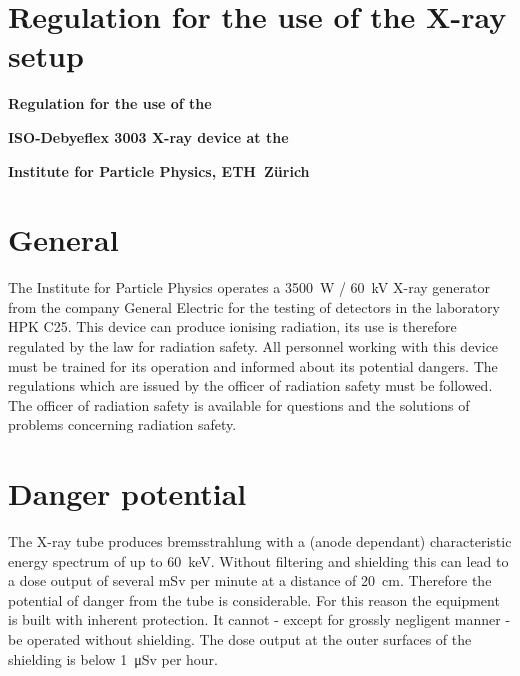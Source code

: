 \documentclass[a4paper,12pt,twoside]{article}
\begin{document}
\begin{appendices}

\section{Regulation for the use of the X-ray setup} \label{Regulation}

\newpage

\begin{center}
{\Large \textbf{Regulation for the use of the}}
\end{center}
\begin{center}
{\Large \textbf{ISO-Debyeflex 3003 X-ray device at the }}
\end{center}
\begin{center}
{\Large \textbf{Institute for Particle Physics, ETH~Z\"urich}}
\end{center}

\vspace{1cm}


\section*{General}

The Institute for Particle Physics operates a \SI{3500}{\watt} / \SI{60}{\kilo\volt} X-ray generator from the company General Electric for the testing of detectors in the laboratory HPK C25. This device can produce ionising radiation, its use is therefore regulated by the law for radiation safety. All personnel working with this device must be trained for its operation and informed about its potential dangers. The regulations which are issued by the officer of radiation safety must be followed. The officer of radiation safety is available for questions and the solutions of problems concerning radiation safety.

\section*{Danger potential}

The X-ray tube produces bremsstrahlung with a (anode dependant) characteristic energy spectrum of up to \SI{60}{\kilo\electronvolt}. Without filtering and shielding this can lead to a dose output of several \si{\milli\sievert} per minute at a distance of \SI{20}{\cm}. Therefore the potential of danger from the tube is considerable. For this reason the equipment is built with inherent protection. It cannot - except for grossly negligent manner - be operated without shielding. The dose output at the outer surfaces of the shielding is below \SI{1}{\micro\sievert} per hour.


\end{appendices}
\end{document}
